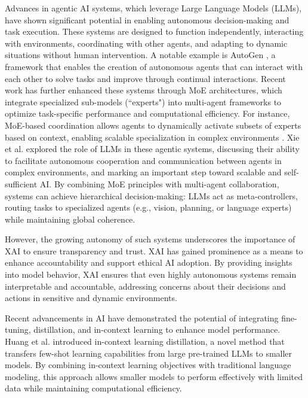 \documentclass[12pt]{article}
\begin{document}
Advances in agentic AI systems, which leverage Large Language Models (LLMs), have shown significant potential in enabling autonomous decision-making and task execution. These systems are designed to function independently, interacting with environments, coordinating with other agents, and adapting to dynamic situations without human intervention. A notable example is AutoGen \cite{wu2023autogen}, a framework that enables the creation of autonomous agents that can interact with each other to solve tasks and improve through continual interactions. Recent work has further enhanced these systems through MoE architectures, which integrate specialized sub-models (``experts") into multi-agent frameworks to optimize task-specific performance and computational efficiency. For instance, MoE-based coordination allows agents to dynamically activate subsets of experts based on context, enabling scalable specialization in complex environments \cite{shazeer2017outrageouslylargeneuralnetworks, lepikhin2020gshard}. Xie et al. \cite{xie2024large} explored the role of LLMs in these agentic systems, discussing their ability to facilitate autonomous cooperation and communication between agents in complex environments, and marking an important step toward scalable and self-sufficient AI. By combining MoE principles with multi-agent collaboration, systems can achieve hierarchical decision-making: LLMs act as meta-controllers, routing tasks to specialized agents (e.g., vision, planning, or language experts) while maintaining global coherence.

However, the growing autonomy of such systems underscores the importance of XAI \cite{ding2022explainability} to ensure transparency and trust. XAI has gained prominence as a means to enhance accountability and support ethical AI adoption. By providing insights into model behavior, XAI ensures that even highly autonomous systems remain interpretable and accountable, addressing concerns about their decisions and actions in sensitive and dynamic environments.


Recent advancements in AI have demonstrated the potential of integrating fine-tuning, distillation, and in-context learning to enhance model performance. Huang et al. \cite{huang2022context} introduced in-context learning distillation, a novel method that transfers few-shot learning capabilities from large pre-trained LLMs to smaller models. By combining in-context learning objectives with traditional language modeling, this approach allows smaller models to perform effectively with limited data while maintaining computational efficiency.
\end{document}
